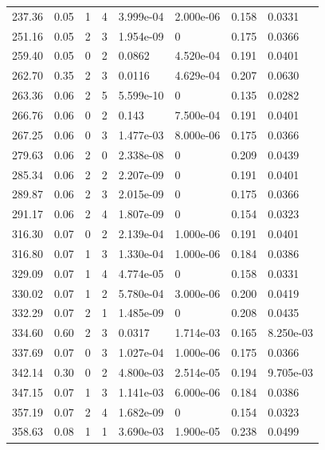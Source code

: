 \documentclass[preview]{standalone}
\begin{document}
{{\begin{tabular}{L{1.2cm}C{1.2cm} C{0.3cm}C{0.5cm} C{1.4cm}C{1.4cm} C{1.4cm}C{1.4cm}}
  237.36  &  0.05  & 1     &  4 &  3.999e-04  & 2.000e-06  & 0.158 &  0.0331   \\ 
  251.16  &  0.05  & 2     &  3 &  1.954e-09  & 0  & 0.175 &  0.0366   \\ 
  259.40  &  0.05  & 0     &  2 &  0.0862  & 4.520e-04  & 0.191 &  0.0401   \\ 
  262.70  &  0.35  & 2     &  3 &  0.0116  & 4.629e-04  & 0.207 &  0.0630   \\ 
  263.36  &  0.06  & 2     &  5 &  5.599e-10  & 0  & 0.135 &  0.0282   \\ 
  266.76  &  0.06  & 0     &  2 &  0.143  & 7.500e-04  & 0.191 &  0.0401   \\ 
  267.25  &  0.06  & 0     &  3 &  1.477e-03  & 8.000e-06  & 0.175 &  0.0366   \\ 
  279.63  &  0.06  & 2     &  0 &  2.338e-08  & 0  & 0.209 &  0.0439   \\ 
  285.34  &  0.06  & 2     &  2 &  2.207e-09  & 0  & 0.191 &  0.0401   \\ 
  289.87  &  0.06  & 2     &  3 &  2.015e-09  & 0  & 0.175 &  0.0366   \\ 
  291.17  &  0.06  & 2     &  4 &  1.807e-09  & 0  & 0.154 &  0.0323   \\ 
  316.30  &  0.07  & 0     &  2 &  2.139e-04  & 1.000e-06  & 0.191 &  0.0401   \\ 
  316.80  &  0.07  & 1     &  3 &  1.330e-04  & 1.000e-06  & 0.184 &  0.0386   \\ 
  329.09  &  0.07  & 1     &  4 &  4.774e-05  & 0  & 0.158 &  0.0331   \\ 
  330.02  &  0.07  & 1     &  2 &  5.780e-04  & 3.000e-06  & 0.200 &  0.0419   \\ 
  332.29  &  0.07  & 2     &  1 &  1.485e-09  & 0  & 0.208 &  0.0435   \\ 
  334.60  &  0.60  & 2     &  3 &  0.0317  & 1.714e-03  & 0.165 &  8.250e-03   \\ 
  337.69  &  0.07  & 0     &  3 &  1.027e-04  & 1.000e-06  & 0.175 &  0.0366   \\ 
  342.14  &  0.30  & 0     &  2 &  4.800e-03  & 2.514e-05  & 0.194 &  9.705e-03   \\ 
  347.15  &  0.07  & 1     &  3 &  1.141e-03  & 6.000e-06  & 0.184 &  0.0386   \\ 
  357.19  &  0.07  & 2     &  4 &  1.682e-09  & 0  & 0.154 &  0.0323   \\ 
  358.63  &  0.08  & 1     &  1 &  3.690e-03  & 1.900e-05  & 0.238 &  0.0499   \\ 

\end{tabular}}}
\end{document}
